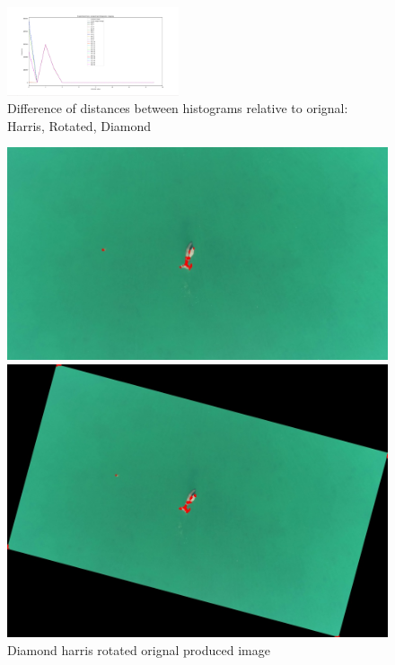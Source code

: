 \documentclass[conference]{IEEEtran}
\begin{document}
\begin{figure}[!htp]
\includegraphics[width=0.45\textwidth]{../programme/results/Task_1/rotated_experiements/Harris/dugong/hists.png}
\centering
\caption{Difference of distances between histograms relative to orignal: Harris, Rotated, Diamond}
\label{Difference of distances between histograms relative to orignal: Harris, Rotated, Diamond}
\end{figure}

\begin{figure}[!htb]
  \centering
  \begin{minipage}[b]{0.2\textwidth}
    \includegraphics[width=\textwidth]{../programme/results/Task_1/rotated_experiements/Harris/dugong/image_0.jpg}
    \caption{Diamond harris rotated orignal produced image}
    \label{Diamond harris rotated orignal produced image}
  \end{minipage}
  \hfill
  \begin{minipage}[b]{0.2\textwidth}
    \includegraphics[width=\textwidth]{../programme/results/Task_1/rotated_experiements/Harris/dugong/image_1.jpg}

\end{minipage}
\end{figure}
\end{document}
